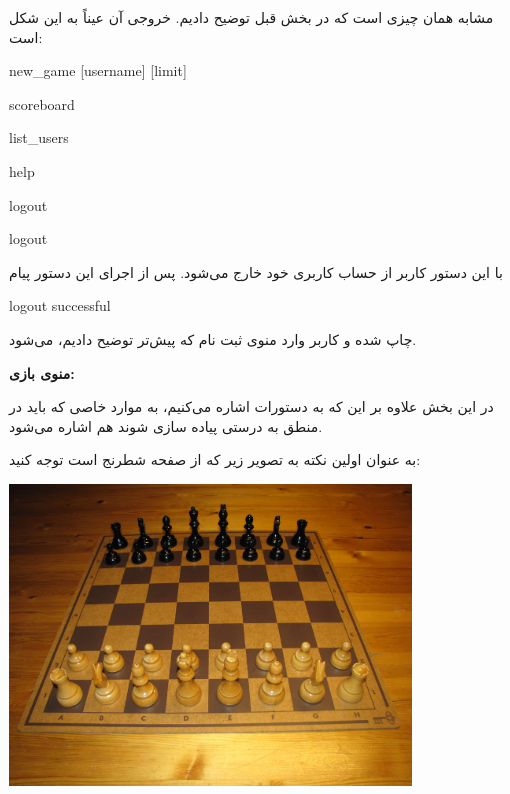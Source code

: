 \documentclass[]{article}
\begin{document}
مشابه همان چیزی است که در بخش قبل توضیح دادیم. خروجی آن عیناً به این شکل است:



\begin{tcolorbox}[boxrule=0pt]
	\begin{latin}
  	  \large{

  	  	new\_game [username] [limit]

scoreboard

list\_users

help

logout
		}
	\end{latin}
\end{tcolorbox}


\hrulefill




\begin{tcolorbox}[boxrule=0pt]
	\begin{latin}
  	  \large{
  	  	logout
		}
	\end{latin}
\end{tcolorbox}

با این دستور کاربر از حساب کاربری خود خارج می‌شود. پس از اجرای این دستور پیام


\begin{tcolorbox}[boxrule=0pt]
	\begin{latin}
  	  \large{
  	  	logout successful
		}
	\end{latin}
\end{tcolorbox}

چاپ شده و کاربر وارد منوی ثبت نام که پیش‌تر توضیح دادیم، می‌شود.

\hrulefill

\hrulefill

\textbf{منوی بازی:}

در این بخش علاوه بر این که به دستورات اشاره می‌کنیم، به موارد خاصی که باید در منطق به درستی پیاده سازی شوند هم اشاره می‌شود.

به عنوان اولین نکته به تصویر زیر که از صفحه شطرنج است توجه کنید:

\includegraphics[width=0.8\textwidth]{chess.jpg}
\end{document}
